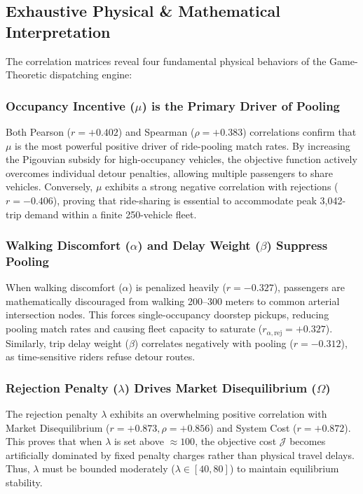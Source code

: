 \documentclass[11pt,a4paper]{article}
\begin{document}
\subsection{Exhaustive Physical \& Mathematical Interpretation}
The correlation matrices reveal four fundamental physical behaviors of the Game-Theoretic dispatching engine:

\subsubsection{Occupancy Incentive ($\mu$) is the Primary Driver of Pooling}
Both Pearson ($r = +0.402$) and Spearman ($\rho = +0.383$) correlations confirm that $\mu$ is the most powerful positive driver of ride-pooling match rates. By increasing the Pigouvian subsidy for high-occupancy vehicles, the objective function actively overcomes individual detour penalties, allowing multiple passengers to share vehicles. Conversely, $\mu$ exhibits a strong negative correlation with rejections ($r = -0.406$), proving that ride-sharing is essential to accommodate peak 3,042-trip demand within a finite 250-vehicle fleet.

\subsubsection{Walking Discomfort ($\alpha$) and Delay Weight ($\beta$) Suppress Pooling}
When walking discomfort ($\alpha$) is penalized heavily ($r = -0.327$), passengers are mathematically discouraged from walking 200--300 meters to common arterial intersection nodes. This forces single-occupancy doorstep pickups, reducing pooling match rates and causing fleet capacity to saturate ($r_{\alpha,\text{rej}} = +0.327$). Similarly, trip delay weight ($\beta$) correlates negatively with pooling ($r = -0.312$), as time-sensitive riders refuse detour routes.

\subsubsection{Rejection Penalty ($\lambda$) Drives Market Disequilibrium ($\Omega$)}
The rejection penalty $\lambda$ exhibits an overwhelming positive correlation with Market Disequilibrium ($r = +0.873, \rho = +0.856$) and System Cost ($r = +0.872$). This proves that when $\lambda$ is set above $\approx 100$, the objective cost $\mathcal{J}$ becomes artificially dominated by fixed penalty charges rather than physical travel delays. Thus, $\lambda$ must be bounded moderately ($\lambda \in [40, 80]$) to maintain equilibrium stability.
\end{document}

